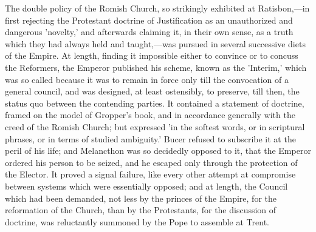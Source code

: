 \documentclass[
]{book}
\begin{document}
The double policy of the Romish Church, so strikingly exhibited at Ratisbon,---in first rejecting the Protestant doctrine of Justification as an unauthorized and dangerous 'novelty,' and afterwards claiming it, in their own sense, as a truth which they had always held and taught,---was pursued in several successive diets of the Empire. At length, finding it impossible either to convince or to concuss the Reformers, the Emperor published his scheme, known as the 'Interim,' which was so called because it was to remain in force only till the convocation of a general council, and was designed, at least ostensibly, to preserve, till then, the status quo between the contending parties. It contained a statement of doctrine, framed on the model of Gropper's book, and in accordance generally with the creed of the Romish Church; but expressed 'in the softest words, or in scriptural phrases, or in terms of studied ambiguity.' Bucer refused to subscribe it at the peril of his life; and Melancthon was so decidedly opposed to it, that the Emperor ordered his person to be seized, and he escaped only through the protection of the Elector. It proved a signal failure, like every other attempt at compromise between systems which were essentially opposed; and at length, the Council which had been demanded, not less by the princes of the Empire, for the reformation of the Church, than by the Protestants, for the discussion of doctrine, was reluctantly summoned by the Pope to assemble at Trent.
\end{document}
